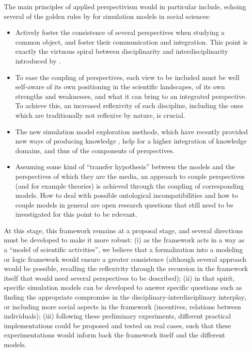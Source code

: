 The main principles of applied perspectivism would in particular include, echoing several of the golden rules by \cite{banos2013pour} for simulation models in social sciences:

\begin{itemize}
	\item Actively foster the consistence of several perspectives when studying a common object, and foster their communication and integration. This point is exactly the virtuous spiral between disciplinarity and interdisciplinarity introduced by \cite{banos2013pour}.
	\item To ease the coupling of perspectives, each view to be included must be well self-aware of its own positioning in the scientific landscapes, of its own strengths and weaknesses, and what it can bring to an integrated perspective. To achieve this, an increased reflexivity of each discipline, including the ones which are traditionally not reflexive by nature, is crucial.
	\item The new simulation model exploration methods, which have recently provided new ways of producing knowledge \cite{pumain2017urban}, help for a higher integration of knowledge domains, and thus of the components of perspectives.
	\item Assuming some kind of ``transfer hypothesis'' between the models and the perspectives of which they are the media, an approach to couple perspectives (and for example theories) is achieved through the coupling of corresponding models. How to deal with possible ontological incompatibilities and how to couple models in general are open research questions that still need to be investigated for this point to be relevant.
\end{itemize}


At this stage, this framework remains at a proposal stage, and several directions must be developed to make it more robust: (i) as the framework acts in a way as a ``model of scientific activities'', we believe that a formalization into a modeling or logic framework would ensure a greater consistence (although several approach would be possible, recalling the reflexivity through the recursion in the framework itself that would need several perspectives to be described); (ii) in that spirit, specific simulation models can be developed to answer specific questions such as finding the appropriate compromise in the disciplinary-interdisciplinary interplay, or including more social aspects in the framework (incentives, relations between individuals); (iii) following these preliminary experiments, different practical implementations could be proposed and tested on real cases, such that these experimentations would inform back the framework itself and the different models.


